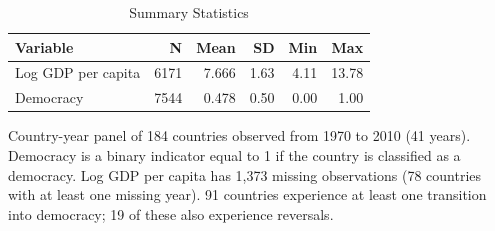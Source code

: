 \begin{table}[H]
\centering
\caption{\label{tab:summary-stats}Summary Statistics}
\centering
\begin{threeparttable}
\begin{tabular}[t]{lrrrrr}
\toprule
Variable & N & Mean & SD & Min & Max\\
\midrule
Log GDP per capita & 6171 & 7.666 & 1.63 & 4.11 & 13.78\\
Democracy & 7544 & 0.478 & 0.50 & 0.00 & 1.00\\
\bottomrule
\end{tabular}
\begin{tablenotes}
\item Country-year panel of 184 countries observed from 1970 to 2010 (41 years). Democracy is a binary indicator equal to 1 if the country is classified as a democracy. Log GDP per capita has 1,373 missing observations (78 countries with at least one missing year). 91 countries experience at least one transition into democracy; 19 of these also experience reversals.
\end{tablenotes}
\end{threeparttable}
\end{table}
